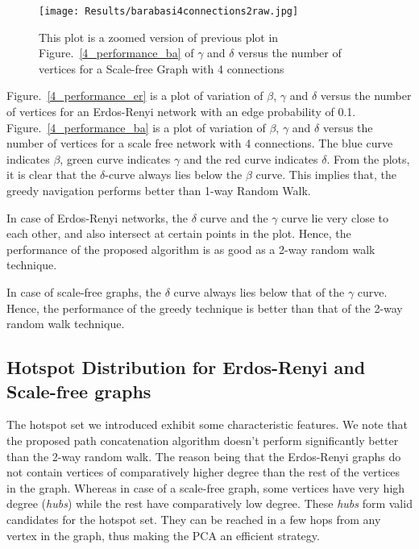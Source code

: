 \documentclass[a4paper,12pt]{article}
\begin{document}
\begin{figure}[htp!]
\centering
\texttt{[image: Results/barabasi4connections2raw.jpg]}
\caption{This plot is a zoomed version of previous plot in 
Figure.~\ref{4_performance_ba} of  $\gamma$ and $\delta$ versus the number
of vertices for a Scale-free Graph with 4 connections}
\label{4_performance_ba_zoom}
\end{figure}


Figure.~\ref{4_performance_er} is a plot of variation of $\beta$, 
$\gamma$ and $\delta$ versus the number of vertices for an Erdos-Renyi network 
with an edge probability of 0.1. Figure.~\ref{4_performance_ba} is a plot of variation of 
$\beta$, $\gamma$ and $\delta$ versus the number of vertices for a 
scale free network with 4 connections. The blue curve indicates $\beta$, green curve 
indicates $\gamma$ and the red curve indicates $\delta$. From the plots, it is clear 
that the $\delta$-curve always lies below the $\beta$ curve. This implies that, the 
greedy navigation performs better than 1-way Random Walk.

In case of Erdos-Renyi networks, the $\delta$ curve and the $\gamma$ curve lie very 
close to each other, and also intersect at certain points in the plot. Hence, the 
performance of the proposed algorithm is as good as a 2-way random walk technique.

In case of scale-free graphs, the $\delta$ curve always lies below that 
of the $\gamma$ curve. Hence, the performance of the greedy technique is better than 
that of the 2-way random walk technique.



\subsection{Hotspot Distribution for Erdos-Renyi and Scale-free graphs}

The hotspot set we introduced exhibit some characteristic features. We note that 
the proposed path concatenation algorithm doesn't perform significantly 
better than the 2-way random walk. The reason being that the Erdos-Renyi graphs do not 
contain vertices of comparatively higher degree than the rest of the vertices in the graph. 
Whereas in case of a scale-free graph, some vertices have very high degree (\emph{hubs})
while the rest have comparatively low degree. These \emph{hubs} form valid candidates for 
the hotspot set. They can be reached in a few hops from any vertex in the graph, 
thus making the PCA an efficient strategy.
\end{document}
